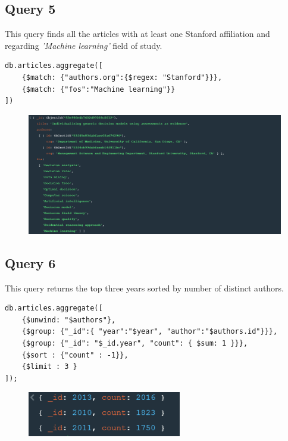 \documentclass{Configuration_Files/PoliMi3i_thesis}
\begin{document}
\subsection{Query 5}
This query finds all the articles with at least one Stanford affiliation and regarding \emph{'Machine learning'} field
of study.
\begin{lstlisting}
db.articles.aggregate([
	{$match: {"authors.org":{$regex: "Stanford"}}},
	{$match: {"fos":"Machine learning"}}
])
\end{lstlisting}
\begin{figure}[H]
\centering
\includegraphics[width=1\textwidth]{query/mongo_q5.PNG}
\label{fig:query5}
\end{figure}

\subsection{Query 6}
This query returns the top three years sorted by number of distinct authors.
\begin{lstlisting}
db.articles.aggregate([
	{$unwind: "$authors"},
	{$group: {"_id":{ "year":"$year", "author":"$authors.id"}}},
	{$group: {"_id": "$_id.year", "count": { $sum: 1 }}},
	{$sort : {"count" : -1}},
	{$limit : 3 }
]);
\end{lstlisting}
\begin{figure}[H]
\centering
\includegraphics[width=0.6\textwidth]{query/mongo_q6.PNG}
\label{fig:query6}
\end{figure}
\end{document}
